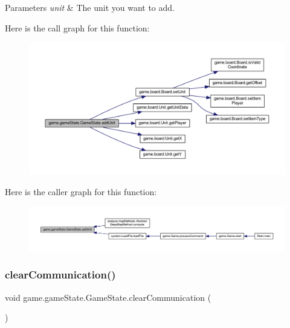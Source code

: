 \begin{DoxyParams}{Parameters}
{\em unit} & The unit you want to add. \\
\hline
\end{DoxyParams}
Here is the call graph for this function\+:
\nopagebreak
\begin{figure}[H]
\begin{center}
\leavevmode
\includegraphics[width=350pt]{classgame_1_1game_state_1_1_game_state_a1e0ecf6737cb33799a09b30eb5f81431_cgraph}
\end{center}
\end{figure}
Here is the caller graph for this function\+:
\nopagebreak
\begin{figure}[H]
\begin{center}
\leavevmode
\includegraphics[width=350pt]{classgame_1_1game_state_1_1_game_state_a1e0ecf6737cb33799a09b30eb5f81431_icgraph}
\end{center}
\end{figure}
\mbox{\label{classgame_1_1game_state_1_1_game_state_a41a6717791a72572de33f8e4fe2b956a}} 
\subsubsection{\texorpdfstring{clear\+Communication()}{clearCommunication()}}
{\footnotesize\ttfamily void game.\+game\+State.\+Game\+State.\+clear\+Communication (\begin{DoxyParamCaption}{ }\end{DoxyParamCaption})\hspace{0.3cm}{\ttfamily [inline]}}

